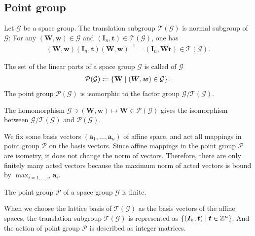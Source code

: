 \subsection{Point group}

Let $\mathcal{G}$ be a space group.
The translation subgroup $\mathcal{T}(\mathcal{G})$ is normal subgroup of $\mathcal{G}$:
For any $ (\mathbf{W}, \mathbf{w}) \in \mathcal{G}$ and $(\mathbf{I}_{n}, \mathbf{t}) \in \mathcal{T}(\mathcal{G})$, one has
\begin{align}
  (\bm{W}, \bm{w}) (\bm{I}_{n}, \bm{t}) (\bm{W}, \bm{w})^{-1} = (\bm{I}_{n}, \bm{Wt}) \in \mathcal{T}(\mathcal{G}).
\end{align}

\begin{screen}
  \begin{defn}
    The set of the linear parts of a space group $\mathcal{G}$ is called  of $\mathcal{G}$
    \begin{align}
      \mathcal{P}(\mathcal{G}) \coloneqq \left\{  \mathbf{W}  \mathrel{}\middle|\mathrel{}  (\bm{W}, \bm{w}) \in \mathcal{G}  \right\}.
    \end{align}
    The point group $\mathcal{P}(\mathcal{G})$ is isomorphic to the factor group $\mathcal{G} / \mathcal{T}(\mathcal{G})$.
  \end{defn}
\end{screen}

The homomorphism $\mathcal{G} \ni (\bm{W}, \bm{w}) \mapsto \bm{W} \in \mathcal{P}(\mathcal{G})$ gives the isomorphism between $\mathcal{G} / \mathcal{T}(\mathcal{G})$ and $\mathcal{P}(\mathcal{G})$.

We fix some basis vectors $(\bm{a}_{1}, \dots, \bm{a}_{n})$ of affine space, and act all mappings in point group $\mathcal{P}$ on the basis vectors.
Since affine mappings in the point group $\mathcal{P}$ are isometry, it does not change the norm of vectors.
Therefore, there are only finitely many acted vectors because the maximum norm of acted vectors is bound by $\max_{i=1,\dots,n} \mathbf{a}_{i}$.

\begin{screen}
  \begin{them}
    The point group $\mathcal{P}$ of a space group $\mathcal{G}$ is finite.
  \end{them}
\end{screen}

When we choose the lattice basis of $\mathcal{T}(\mathcal{G})$ as the basis vectors of the affine spaces, the translation subgroup $\mathcal{T}(\mathcal{G})$ is represented as $\left\{  (\bm{I}_{n}, \bm{t})  \mathrel{}\middle|\mathrel{}  \bm{t} \in \mathbb{Z}^{n}  \right\}$.
And the action of point group $\mathcal{P}$ is described as integer matrices.

